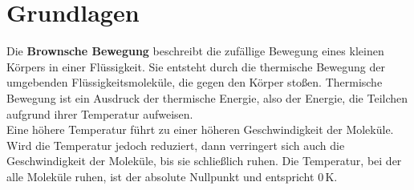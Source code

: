 \section*{Grundlagen}

Die \textbf{Brownsche Bewegung} beschreibt die zufällige Bewegung eines kleinen Körpers in einer Flüssigkeit. Sie entsteht durch die thermische Bewegung der umgebenden Flüssigkeitsmoleküle, die gegen den Körper stoßen.
Thermische Bewegung ist ein Ausdruck der thermische Energie, also der Energie, die Teilchen aufgrund ihrer Temperatur aufweisen.\\
Eine höhere Temperatur führt zu einer höheren Geschwindigkeit der Moleküle. Wird die Temperatur jedoch reduziert, dann verringert sich auch die Geschwindigkeit der Moleküle, bis sie schließlich ruhen. Die Temperatur, bei der alle Moleküle ruhen, ist der absolute Nullpunkt und entspricht $0 \,$K.\\

